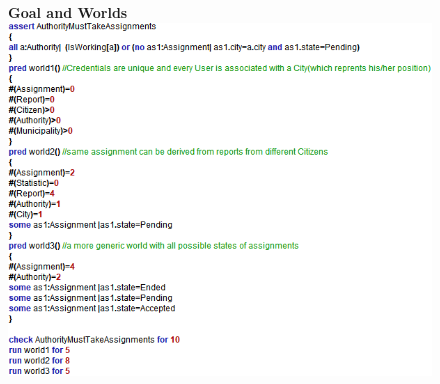 \begin{figure}[h]
\centering
\textbf{Goal and Worlds}
\includegraphics[width=\textwidth]{Images/alworlds.png}
\end{figure}


